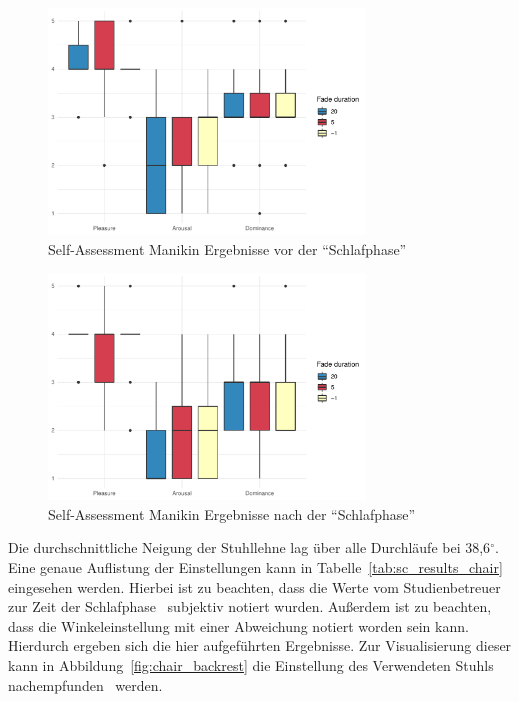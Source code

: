 \begin{figure}
	\centering
	\includegraphics[width=0.75\textwidth]{./appendices/SAMpre}
	\caption{Self-Assessment Manikin Ergebnisse vor der "`Schlafphase"'}
	\label{fig:samPre}
\end{figure}%
\begin{figure}
	\centering
	\includegraphics[width=0.75\textwidth]{./appendices/SAMpost}
	\caption{Self-Assessment Manikin Ergebnisse nach der "`Schlafphase"'}
	\label{fig:samPost}
\end{figure}

Die durchschnittliche Neigung der Stuhllehne lag über alle Durchläufe bei 38,6$^\circ$. Eine genaue Auflistung der Einstellungen kann in Tabelle~\ref{tab:sc_results_chair} eingesehen werden. Hierbei ist zu beachten, dass die Werte vom Studienbetreuer zur Zeit der Schlafphase~ subjektiv notiert wurden. Außerdem ist zu beachten, dass die Winkeleinstellung mit einer Abweichung notiert worden sein kann. Hierdurch ergeben sich die hier aufgeführten Ergebnisse. Zur Visualisierung dieser kann in Abbildung~\ref{fig:chair_backrest} die Einstellung des Verwendeten Stuhls nachempfunden~ werden.

